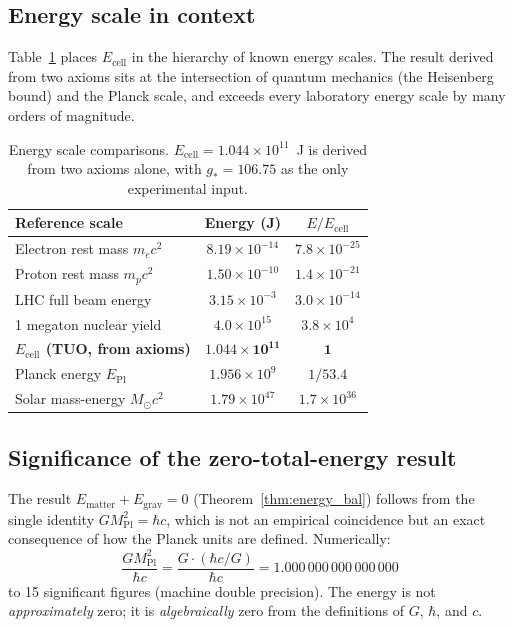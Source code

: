 \documentclass[12pt,a4paper]{article}
\theoremstyle{definition}
\theoremstyle{remark}
\newcommand{\EPl}{E_{\mathrm{Pl}}}
\newcommand{\MPl}{M_{\mathrm{Pl}}}
\newcommand{\gstar}{g_{*}}
\begin{document}
\subsection{Energy scale in context}

Table~\ref{tab:energy_context} places $E_\mathrm{cell}$ in the hierarchy
of known energy scales. The result derived from two axioms sits
at the intersection of quantum mechanics (the Heisenberg bound) and
the Planck scale, and exceeds every laboratory energy scale by many orders
of magnitude.

\begin{table}[ht]
\centering
\caption{Energy scale comparisons. $E_\mathrm{cell} = 1.044 \times 10^{11}$~J is
derived from two axioms alone, with $\gstar = 106.75$ as the only experimental input.}
\label{tab:energy_context}
\begin{tabular}{lcc}
\toprule
Reference scale & Energy (J) & $E/E_\mathrm{cell}$ \\
\midrule
Electron rest mass $m_e c^2$ & $8.19 \times 10^{-14}$ & $7.8 \times 10^{-25}$ \\
Proton rest mass $m_p c^2$ & $1.50 \times 10^{-10}$ & $1.4 \times 10^{-21}$ \\
LHC full beam energy & $3.15 \times 10^{-3}$ & $3.0 \times 10^{-14}$ \\
1 megaton nuclear yield & $4.0 \times 10^{15}$ & $3.8 \times 10^{4}$ \\
\textbf{$E_\mathrm{cell}$ (TUO, from axioms)} & $\mathbf{1.044 \times 10^{11}}$ & $\mathbf{1}$ \\
Planck energy $\EPl$ & $1.956 \times 10^{9}$ & $1/53.4$ \\
Solar mass-energy $M_\odot c^2$ & $1.79 \times 10^{47}$ & $1.7 \times 10^{36}$ \\
\bottomrule
\end{tabular}
\end{table}

\subsection{Significance of the zero-total-energy result}

The result $E_\mathrm{matter} + E_\mathrm{grav} = 0$ (Theorem~\ref{thm:energy_bal})
follows from the single identity $G\MPl^2 = \hbar c$, which is not an
empirical coincidence but an exact consequence of how the Planck units are
defined. Numerically:
\begin{equation}
  \frac{G\MPl^2}{\hbar c}
  = \frac{G \cdot (\hbar c / G)}{\hbar c}
  = 1.000\,000\,000\,000\,000
\end{equation}
to 15 significant figures (machine double precision).
The energy is not \emph{approximately} zero; it is \emph{algebraically}
zero from the definitions of $G$, $\hbar$, and $c$.
\end{document}
